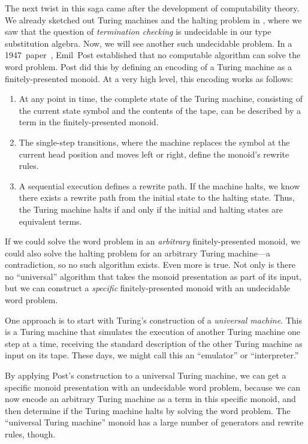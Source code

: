 \documentclass[../generics]{subfiles}
\begin{document}
The next twist in this saga came after the development of computability theory. We already sketched out Turing machines and the halting problem in , where we saw that the question of \emph{termination checking} is undecidable in our type substitution algebra. Now, we will see another such undecidable problem. In a 1947~paper~\cite{post_1947}, Emil~Post established that no computable algorithm can solve the word problem. Post did this by defining an encoding of a Turing machine as a finitely-presented monoid. At a very high level, this encoding works as follows:
\begin{enumerate}
\item At any point in time, the complete state of the Turing machine, consisting of the current state symbol and the contents of the tape, can be described by a term in the finitely-presented monoid.
\item The single-step transitions, where the machine replaces the symbol at the current head position and moves left or right, define the monoid's rewrite rules.
\item A sequential execution defines a rewrite path. If the machine halts, we know there exists a rewrite path from the initial state to the halting state. Thus, the Turing machine halts if and only if the initial and halting states are equivalent terms.
\end{enumerate}
If we could solve the word problem in an \emph{arbitrary} finitely-presented monoid, we could also solve the halting problem for an arbitrary Turing machine---a contradiction, so no such algorithm exists. Even more is true. Not only is there no ``universal'' algorithm that takes the monoid presentation as part of its input, but we can construct a \emph{specific} finitely-presented monoid with an undecidable word problem.

One approach is to start with Turing's construction of a \emph{universal machine}. This is a Turing machine that simulates the execution of another Turing machine one step at a time, receiving the standard description of the other Turing machine as input on its tape. These days, we might call this an ``emulator'' or ``interpreter.''

By applying Post's construction to a universal Turing machine, we can get a specific monoid presentation with an undecidable word problem, because we can now encode an arbitrary Turing machine as a term in this specific monoid, and then determine if the Turing machine halts by solving the word problem. The ``universal Turing machine'' monoid has a large number of generators and rewrite rules, though.
\end{document}
